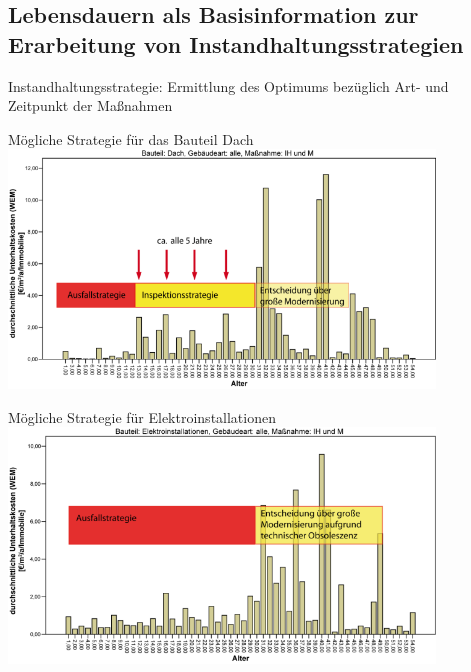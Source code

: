 \documentclass[fleqn,twoside,dvipsnames]{article}
\begin{document}
\begin{itemize}
        \subsection{Lebensdauern als Basisinformation zur Erarbeitung von Instandhaltungsstrategien}
            \item Instandhaltungsstrategie: Ermittlung des Optimums bezüglich Art- und Zeitpunkt der Maßnahmen
            \begin{minipage}{0.5\textwidth}
            \item Mögliche Strategie für das Bauteil Dach\\
                \includegraphics[width=0.85\textwidth]{Grafiken/Lebensdauer und Abnutzung von Bauteilen/Strategie Dach.png}
            \end{minipage}
            \begin{minipage}{0.5\textwidth}
            \item Mögliche Strategie für Elektroinstallationen\\
                \includegraphics[width=0.85\textwidth]{Grafiken/Lebensdauer und Abnutzung von Bauteilen/Strategie Elektro.png}
            \end{minipage}
            

\end{itemize}
\end{document}
